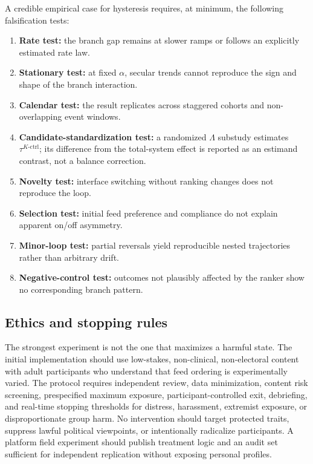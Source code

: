 \documentclass[pdflatex,sn-mathphys-num]{sn-jnl}
\begin{document}
A credible empirical case for hysteresis requires, at minimum, the following falsification tests:
\begin{enumerate}
  \item \textbf{Rate test:} the branch gap remains at slower ramps or follows an explicitly estimated rate law.
  \item \textbf{Stationary test:} at fixed $\alpha$, secular trends cannot reproduce the sign and shape of the branch interaction.
  \item \textbf{Calendar test:} the result replicates across staggered cohorts and non-overlapping event windows.
  \item \textbf{Candidate-standardization test:} a randomized $\Lambda$ substudy estimates $\tau^{K\text{-}\mathrm{ctrl}}$; its difference from the total-system effect is reported as an estimand contrast, not a balance correction.
  \item \textbf{Novelty test:} interface switching without ranking changes does not reproduce the loop.
  \item \textbf{Selection test:} initial feed preference and compliance do not explain apparent on/off asymmetry.
  \item \textbf{Minor-loop test:} partial reversals yield reproducible nested trajectories rather than arbitrary drift.
  \item \textbf{Negative-control test:} outcomes not plausibly affected by the ranker show no corresponding branch pattern.
\end{enumerate}

\subsection{Ethics and stopping rules}

The strongest experiment is not the one that maximizes a harmful state. The initial implementation should use low-stakes, non-clinical, non-electoral content with adult participants who understand that feed ordering is experimentally varied. The protocol requires independent review, data minimization, content risk screening, prespecified maximum exposure, participant-controlled exit, debriefing, and real-time stopping thresholds for distress, harassment, extremist exposure, or disproportionate group harm. No intervention should target protected traits, suppress lawful political viewpoints, or intentionally radicalize participants. A platform field experiment should publish treatment logic and an audit set sufficient for independent replication without exposing personal profiles.
\end{document}
